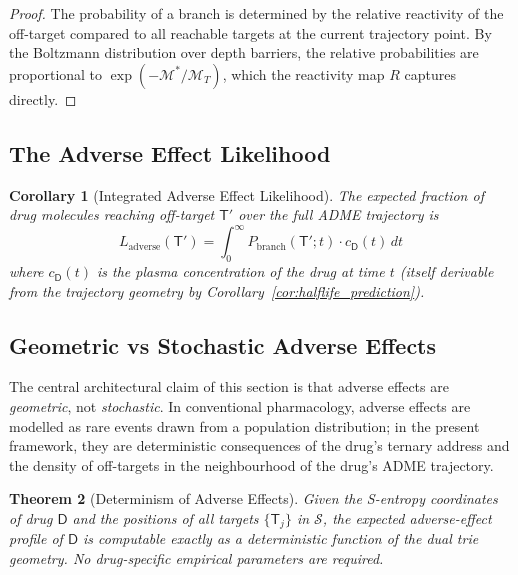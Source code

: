 \documentclass[11pt,twocolumn,a4paper]{article}
\newtheorem{theorem}{Theorem}[section]
\newtheorem{corollary}[theorem]{Corollary}
\theoremstyle{definition}
\theoremstyle{remark}
\newcommand{\Sspace}{\mathcal{S}}
\newcommand{\Depth}{\mathcal{M}}
\newcommand{\Drug}{\mathsf{D}}
\newcommand{\Target}{\mathsf{T}}
\begin{document}
\begin{proof}
The probability of a branch is determined by the relative reactivity of the off-target compared to all reachable targets at the current trajectory point. By the Boltzmann distribution over depth barriers, the relative probabilities are proportional to $\exp(-\Depth^*/\Depth_T)$, which the reactivity map $R$ captures directly.
\end{proof}

\subsection{The Adverse Effect Likelihood}

\begin{corollary}[Integrated Adverse Effect Likelihood]
\label{cor:adverse_likelihood}
The expected fraction of drug molecules reaching off-target $\Target'$ over the full ADME trajectory is
\begin{equation}
L_{\mathrm{adverse}}(\Target') = \int_0^\infty P_{\mathrm{branch}}(\Target'; t) \cdot c_\Drug(t) \, dt
\end{equation}
where $c_\Drug(t)$ is the plasma concentration of the drug at time $t$ (itself derivable from the trajectory geometry by Corollary~\ref{cor:halflife_prediction}).
\end{corollary}

\subsection{Geometric vs Stochastic Adverse Effects}

The central architectural claim of this section is that adverse effects are \emph{geometric}, not \emph{stochastic}. In conventional pharmacology, adverse effects are modelled as rare events drawn from a population distribution; in the present framework, they are deterministic consequences of the drug's ternary address and the density of off-targets in the neighbourhood of the drug's ADME trajectory.

\begin{theorem}[Determinism of Adverse Effects]
\label{thm:adverse_det}
Given the S-entropy coordinates of drug $\Drug$ and the positions of all targets $\{\Target_j\}$ in $\Sspace$, the expected adverse-effect profile of $\Drug$ is computable exactly as a deterministic function of the dual trie geometry. No drug-specific empirical parameters are required.
\end{theorem}
\end{document}
